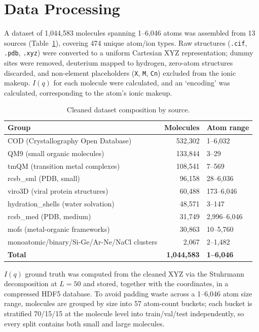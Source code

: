 \documentclass[final]{article}
\begin{document}
\section{Data Processing}
A dataset of 1,044,583 molecules spanning 1--6,046 atoms was assembled from 13 sources
(Table~\ref{tab:dataset}), covering 474 unique atom/ion types. 
Raw structures (\texttt{.cif}, \texttt{.pdb}, \texttt{.xyz}) were converted to a 
uniform Cartesian XYZ representation; dummy sites
were removed, deuterium mapped to hydrogen, zero-atom structures discarded, and
non-element placeholders (\texttt{X}, \texttt{M}, \texttt{Cn}) excluded from the
ionic makeup. $I(q)$ for each molecule were calculated, and an `encoding' was calculated,
corresponding to the atom's ionic makeup.

\begin{table}
\centering
\small
\caption{Cleaned dataset composition by source.}
\label{tab:dataset}
\begin{tabular}{lrl}
\toprule
Group & Molecules & Atom range \\
\midrule
COD (Crystallography Open Database)     & 532,302 & 1--6,032 \\
QM9 (small organic molecules)           & 133,844 & 3--29 \\
tmQM (transition metal complexes)       & 108,541 & 7--569 \\
rcsb\_sml (PDB, small)                  & 96,158  & 28--6,036 \\
viro3D (viral protein structures)       & 60,488  & 173--6,046 \\
hydration\_shells (water solvation)     & 48,571  & 3--147 \\
rcsb\_med (PDB, medium)                 & 31,749  & 2,996--6,046 \\
mofs (metal-organic frameworks)         & 30,863  & 10--5,760 \\
monoatomic/binary/Si-Ge/Ar-Ne/NaCl clusters & 2,067 & 2--1,482 \\
\midrule
\textbf{Total} & \textbf{1,044,583} & \textbf{1--6,046} \\
\bottomrule
\end{tabular}
\end{table}

$I(q)$ ground truth was computed from the cleaned XYZ via the Stuhrmann decomposition at
$L{=}50$ and stored, together with the coordinates, in a compressed HDF5 database. To
avoid padding waste across a 1--6,046 atom size range, molecules are grouped by size
into 57 atom-count buckets; each bucket is stratified 70/15/15 at the molecule level
into train/val/test independently, so every split contains both small and large
molecules.
\end{document}
